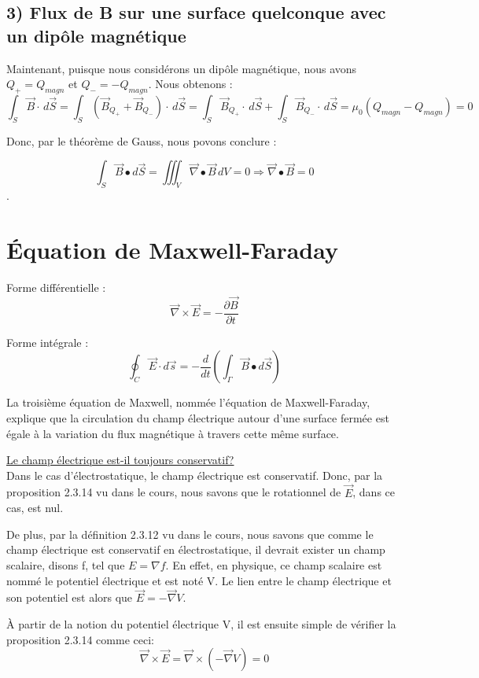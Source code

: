 \documentclass[12pt]{article}
\begin{document}
\subsection*{3) Flux de B sur une surface quelconque avec un dipôle magnétique}
\noindent Maintenant, puisque nous considérons un dipôle magnétique, nous avons $Q_+ = Q_{magn}$ et $Q_- = - Q_{magn}$. Nous obtenons :
$$ \int_{S} \Vec{B} \cdot \,d\Vec{S} = \int_{S} (\Vec{B}_{Q_+} + \Vec{B}_{Q_-}) \cdot \,d\Vec{S} = \int_{S} \Vec{B}_{Q_+} \cdot \,d\Vec{S} + \int_{S} \Vec{B}_{Q_-} \cdot \,d\Vec{S} = \mu_0 (Q_{magn} - Q_{magn}) = 0$$

\noindent Donc, par le théorème de Gauss, nous povons conclure :

$$\int_S \Vec{B} \bullet d\Vec{S} = \iiint_V \vec{\nabla} \bullet \Vec{B} \,dV = 0 \Rightarrow \vec{\nabla} \bullet \Vec{B} = 0$$.


\newpage\section*{Équation de Maxwell-Faraday}

Forme différentielle : $$ \vec{\nabla} \times \vec{E} = - \frac{\partial \vec{B}}{\partial t} $$

Forme intégrale : $$\oint_C \Vec{E} \cdot d\Vec{s} = -\frac{d}{dt} (\int_\Gamma \vec{B} \bullet d\Vec{S})$$

\noindent La troisième équation de Maxwell, nommée l'équation de Maxwell-Faraday, explique que la circulation du champ électrique autour d'une surface fermée est égale à la variation du flux magnétique à travers cette même surface.

\noindent \underline{Le champ électrique est-il toujours conservatif?}
\\\noindent Dans le cas d'électrostatique, le champ électrique est conservatif. Donc, par la proposition 2.3.14 vu dans le cours, nous savons que le rotationnel de $\vec{E}$, dans ce cas, est nul. 

\noindent De plus, par la définition 2.3.12 vu dans le cours, nous savons que comme le champ électrique est conservatif en électrostatique, il devrait exister un champ scalaire, disons f, tel que $E=\nabla f$. En effet, en physique, ce champ scalaire est nommé le potentiel électrique et est noté V. Le lien entre le champ électrique et son potentiel est alors que $\vec{E}=-\vec{\nabla}V$.

\noindent À partir de la notion du potentiel électrique V, il est ensuite simple de vérifier la proposition 2.3.14 comme ceci: $$\vec{\nabla} \times \vec{E}=\vec{\nabla} \times (-\vec{\nabla}V)=0$$
\end{document}
